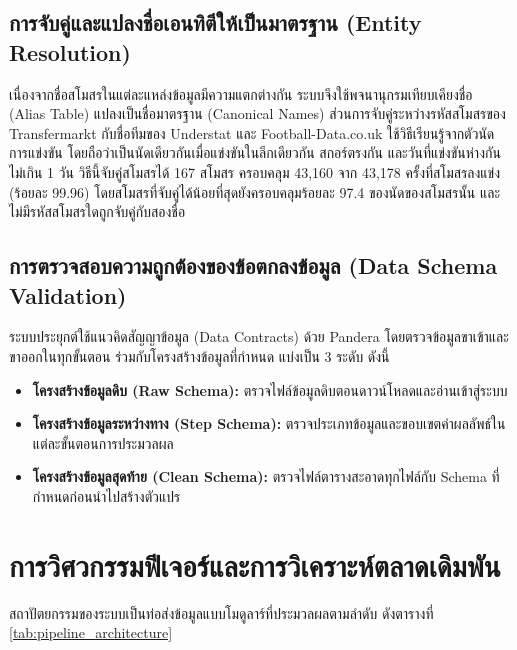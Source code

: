 \subsection{การจับคู่และแปลงชื่อเอนทิตีให้เป็นมาตรฐาน (Entity Resolution)}

เนื่องจากชื่อสโมสรในแต่ละแหล่งข้อมูลมีความแตกต่างกัน ระบบจึงใช้พจนานุกรมเทียบเคียงชื่อ (Alias Table) แปลงเป็นชื่อมาตรฐาน (Canonical Names) ส่วนการจับคู่ระหว่างรหัสสโมสรของ Transfermarkt กับชื่อทีมของ Understat และ Football-Data.co.uk ใช้วิธีเรียนรู้จากตัวนัดการแข่งขัน โดยถือว่าเป็นนัดเดียวกันเมื่อแข่งขันในลีกเดียวกัน สกอร์ตรงกัน และวันที่แข่งขันห่างกันไม่เกิน 1 วัน วิธีนี้จับคู่สโมสรได้ 167 สโมสร ครอบคลุม 43,160 จาก 43,178 ครั้งที่สโมสรลงแข่ง (ร้อยละ 99.96) โดยสโมสรที่จับคู่ได้น้อยที่สุดยังครอบคลุมร้อยละ 97.4 ของนัดของสโมสรนั้น และไม่มีรหัสสโมสรใดถูกจับคู่กับสองชื่อ

\subsection{การตรวจสอบความถูกต้องของข้อตกลงข้อมูล (Data Schema Validation)}

ระบบประยุกต์ใช้แนวคิดสัญญาข้อมูล (Data Contracts) ด้วย Pandera โดยตรวจข้อมูลขาเข้าและขาออกในทุกขั้นตอน ร่วมกับโครงสร้างข้อมูลที่กำหนด แบ่งเป็น 3 ระดับ ดังนี้

\begin{itemize}
    \item \textbf{โครงสร้างข้อมูลดิบ (Raw Schema):} ตรวจไฟล์ข้อมูลดิบตอนดาวน์โหลดและอ่านเข้าสู่ระบบ
    \item \textbf{โครงสร้างข้อมูลระหว่างทาง (Step Schema):} ตรวจประเภทข้อมูลและขอบเขตค่าผลลัพธ์ในแต่ละขั้นตอนการประมวลผล
    \item \textbf{โครงสร้างข้อมูลสุดท้าย (Clean Schema):} ตรวจไฟล์ตารางสะอาดทุกไฟล์กับ Schema ที่กำหนดก่อนนำไปสร้างตัวแปร
\end{itemize}

\section{การวิศวกรรมฟีเจอร์และการวิเคราะห์ตลาดเดิมพัน}

สถาปัตยกรรมของระบบเป็นท่อส่งข้อมูลแบบโมดูลาร์ที่ประมวลผลตามลำดับ ดังตารางที่ \ref{tab:pipeline_architecture}

